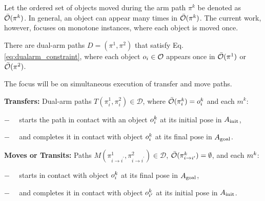 {Let the ordered set of objects moved during the arm path $ \pi^k $ be denoted as $ \bar{\mathcal{O}}(\pi^k) $. In general, an object can appear many times in $ \bar{\mathcal{O}}(\pi^k) $. The current work, however, focuses on monotone instances, where each object is moved once.

{\assumption [Monotonicity] There are dual-arm paths $D = (\pi^1,\pi^2)$ that satisfy Eq. \ref{eq:dualarm_constraint}, where each object $ o_i \in \mathcal{O} $ appears once in $\bar{\mathcal{O}}(\pi^1)$ or $ \bar{\mathcal{O}}(\pi^2)$.}

The focus will be on simultaneous execution of transfer and move paths. 

\noindent\textbf{Transfers:} Dual-arm paths $T(\pi^1_i,\pi^2_i) \in \mathcal{D}$, where $ \bar{\mathcal{O}}(\pi^k_i) =  o^k_i $ and each $m^k$:
\begin{myitem}
\item[$-$]\ \ starts the path in contact with an object $o^k_i$ at its initial pose in $A_{\rm init}$,
\item[$-$]\ \ and completes it in contact with object $ o^k_i $ at its final pose in $A_{\rm goal}$. 
\end{myitem}

\noindent\textbf{Moves or Transits:} Paths $M(\pi^1_{i\rightarrow i^{\prime}},\pi^2_{i\rightarrow i^{\prime}}) \in \mathcal{D}$, $ \bar{\mathcal{O}}(\pi^k_{i\rightarrow i^{\prime}}) = \emptyset $, and each $m^k$:
\begin{myitem}
\item[$-$]\ \  starts in contact with object $o^k_i$ at its final pose in $A_{\rm goal}$,
\item[$-$]\ \  and completes it in contact with object $o^k_{i^{\prime}}$ at its initial pose in $A_{\rm init}$.
\end{myitem}

}

